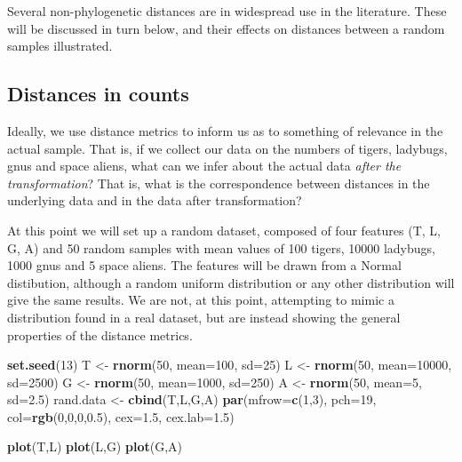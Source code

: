 \documentclass[twocolumn]{article}
\newenvironment{Shaded}{\begin{snugshade}}{\end{snugshade}}
\newcommand{\KeywordTok}[1]{\textcolor[rgb]{0.13,0.29,0.53}{\textbf{{#1}}}}
\newcommand{\DataTypeTok}[1]{\textcolor[rgb]{0.13,0.29,0.53}{{#1}}}
\newcommand{\DecValTok}[1]{\textcolor[rgb]{0.00,0.00,0.81}{{#1}}}
\newcommand{\FloatTok}[1]{\textcolor[rgb]{0.00,0.00,0.81}{{#1}}}
\newcommand{\StringTok}[1]{\textcolor[rgb]{0.31,0.60,0.02}{{#1}}}
\newcommand{\NormalTok}[1]{{#1}}
\begin{document}
Several non-phylogenetic distances are in widespread use in the
literature. These will be discussed in turn below, and their effects on
distances between a random samples illustrated.

\subsection{Distances in counts}

Ideally, we use distance metrics to inform us as to something of
relevance in the actual sample. That is, if we collect our data on the
numbers of tigers, ladybugs, gnus and space aliens, what can we infer
about the actual data \emph{after the transformation}? That is, what is
the correspondence between distances in the underlying data and in the
data after transformation?

At this point we will set up a random dataset, composed of four features
(T, L, G, A) and 50 random samples with mean values of 100 tigers, 10000
ladybugs, 1000 gnus and 5 space aliens. The features will be drawn from
a Normal distibution, although a random uniform distribution or any
other distribution will give the same results. We are not, at this
point, attempting to mimic a distribution found in a real dataset, but
are instead showing the general properties of the distance metrics.

\begin{Shaded}
\begin{Highlighting}[]
\KeywordTok{set.seed}\NormalTok{(}\DecValTok{13}\NormalTok{)}
\NormalTok{T <-}\StringTok{ }\KeywordTok{rnorm}\NormalTok{(}\DecValTok{50}\NormalTok{, }\DataTypeTok{mean=}\DecValTok{100}\NormalTok{, }\DataTypeTok{sd=}\DecValTok{25}\NormalTok{)}
\NormalTok{L <-}\StringTok{ }\KeywordTok{rnorm}\NormalTok{(}\DecValTok{50}\NormalTok{, }\DataTypeTok{mean=}\DecValTok{10000}\NormalTok{, }\DataTypeTok{sd=}\DecValTok{2500}\NormalTok{)}
\NormalTok{G <-}\StringTok{ }\KeywordTok{rnorm}\NormalTok{(}\DecValTok{50}\NormalTok{, }\DataTypeTok{mean=}\DecValTok{1000}\NormalTok{, }\DataTypeTok{sd=}\DecValTok{250}\NormalTok{)}
\NormalTok{A <-}\StringTok{ }\KeywordTok{rnorm}\NormalTok{(}\DecValTok{50}\NormalTok{, }\DataTypeTok{mean=}\DecValTok{5}\NormalTok{, }\DataTypeTok{sd=}\FloatTok{2.5}\NormalTok{)}
\NormalTok{rand.data <-}\StringTok{ }\KeywordTok{cbind}\NormalTok{(T,L,G,A)}
\KeywordTok{par}\NormalTok{(}\DataTypeTok{mfrow=}\KeywordTok{c}\NormalTok{(}\DecValTok{1}\NormalTok{,}\DecValTok{3}\NormalTok{), }\DataTypeTok{pch=}\DecValTok{19}\NormalTok{, }\DataTypeTok{col=}\KeywordTok{rgb}\NormalTok{(}\DecValTok{0}\NormalTok{,}\DecValTok{0}\NormalTok{,}\DecValTok{0}\NormalTok{,}\FloatTok{0.5}\NormalTok{),}
    \DataTypeTok{cex=}\FloatTok{1.5}\NormalTok{, }\DataTypeTok{cex.lab=}\FloatTok{1.5}\NormalTok{)}

\KeywordTok{plot}\NormalTok{(T,L)}
\KeywordTok{plot}\NormalTok{(L,G)}
\KeywordTok{plot}\NormalTok{(G,A)}
\end{Highlighting}
\end{Shaded}
\end{document}
